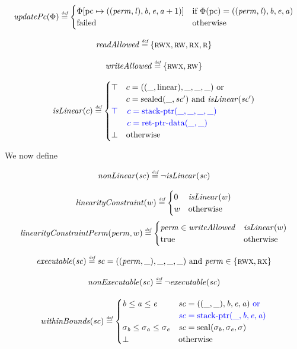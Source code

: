 \documentclass[a4paper]{article}
\begin{document}
\[
  \updPcAddr{\Phi} \defeq 
  \begin{cases}
    \Phi\update{\pcreg}{((\perm,\lin),\baddr,\eaddr,\aaddr+1)} & \text{if $\Phi(\pcreg) = ((\perm,\lin),\baddr,\eaddr,\aaddr)$}\\
    \failed & \totherwise
  \end{cases}
\]

\[
  \readAllowed{} \defeq \{ \rwx,\rw,\rx,\ro \}
\]

\[
  \writeAllowed{} \defeq \{ \rwx, \rw \}
\]

\[
  \isLinear{c} \defeq
  \begin{cases}
    \top & 
    \arraycolsep=0pt
    \begin{array}[t]{l}
      c = ((\_,\linear),\_,\_,\_) \tor\\
      c = \sealed{\_,\cb'} \tand \isLinear{\cb'} 
    \end{array}\\
    \src{\top} & 
    \sourcecolor\left.
    \arraycolsep=0pt
    \begin{array}[t]{l}
      c = \stkptr{\_,\_,\_,\_}\\
      c = \retptrd(\_,\_)\\
    \end{array}\right.\\
    \bot & \totherwise
  \end{cases}
\]

We now define 

\[
  \nonLinear{\cb} \defeq \neg \isLinear{\cb}
\]

\[
  \linCons{w} \defeq
  \begin{cases}
    0 & \isLinear{w} \\
    w & \totherwise
  \end{cases}
\]
\[
  \linConsPerm{\perm}{w} \defeq
  \begin{cases}
    \perm \in \writeAllowed{} & \isLinear{w} \\
    \mathrm{true} & \totherwise
  \end{cases}
\]

\[
  \exec{\cb} \defeq 
      \cb = ((\perm, \_), \_, \_, \_) \tand \perm \in \{\rwx,\rx\} 
\]

\[
  \nonExec{\cb} \defeq \neg \exec{\cb}
\]

\[
  \withinBounds{\vsc} \defeq 
  \begin{cases}
    \baddr \leq \aaddr \leq \eaddr & 
    \arraycolsep=0pt
    \begin{array}[t]{l}
      \vsc = ((\_,\_),\baddr,\eaddr,\aaddr) \src{\tor}\\
      \src{\vsc = \stkptr{\_,\baddr,\eaddr,\aaddr}}
    \end{array}\\
    \sigma_\baddr \leq \sigma_\aaddr \leq \sigma_\eaddr & \vsc = \seal{\sigma_\baddr,\sigma_\eaddr,\sigma} \\
    \bot & \totherwise
  \end{cases}
\]
\end{document}
